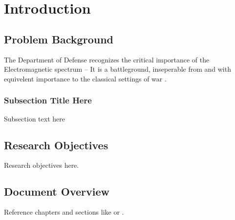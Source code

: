 \chapter{Introduction}
\label{ch:introduction}
\glsresetall

\section{Problem Background}

The Department of Defense recognizes the critical importance of the Electromagnetic spectrum -- It is a battleground, inseperable from and with equivelent importance to the classical settings of war \cite{DOD_ESSS}.

\subsection{Subsection Title Here}

Subsection text here


\section{Research Objectives}

Research objectives here.

\section{Document Overview}

Reference chapters and sections like  or .
